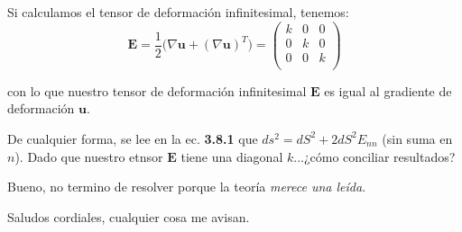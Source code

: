 \documentclass[10pt,a4paper]{article}
\begin{document}
Si calculamos el tensor de deformación infinitesimal, tenemos:
\begin{equation}
\mathbf{E} =\frac{1}{2}\big( \nabla \mathbf{u} + (\nabla \mathbf{u}) ^T  \big) = 
\begin{pmatrix}
k &  0 & 0 \\ 
0 &  k & 0 \\ 
0 &  0 & k \\ 
\end{pmatrix}
\end{equation}

\noindent con lo que nuestro tensor de deformación infinitesimal $\mathbf{E}$ es igual al gradiente de deformación $\mathbf{u}$.

De cualquier forma, se lee en la ec. \textbf{3.8.1} que $ds^2 = dS^2 + 2dS^2 E_{nn}$ (sin suma en $n$). Dado que nuestro etnsor $\mathbf{E}$ tiene una diagonal $k$...¿cómo conciliar resultados?


Bueno, no termino de resolver porque la teoría \textit{merece una leída}.

Saludos cordiales, cualquier cosa me avisan.




%
\end{document}
